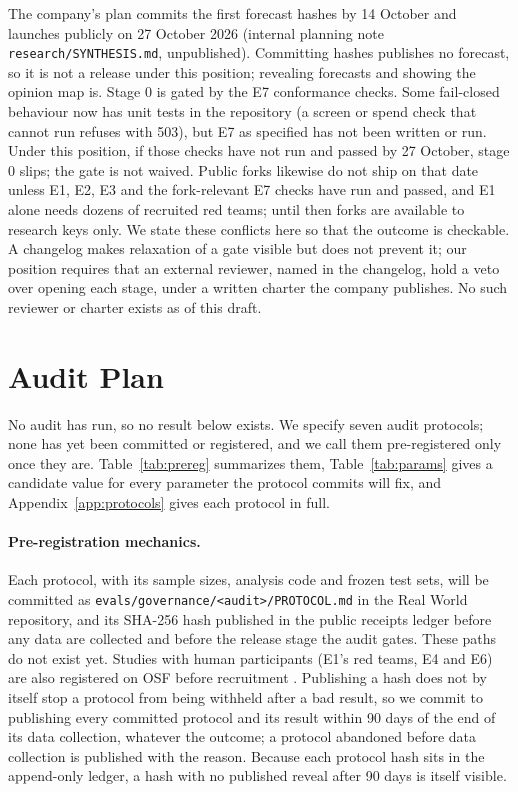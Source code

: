 \documentclass[11pt]{article}
\newcommand{\internal}[1]{internal planning note \nolinkurl{#1}, unpublished}
\begin{document}
The company's plan commits the first forecast hashes by 14 October and launches publicly on 27 October 2026 (\internal{research/SYNTHESIS.md}). Committing hashes publishes no forecast, so it is not a release under this position; revealing forecasts and showing the opinion map is. Stage 0 is gated by the E7 conformance checks. Some fail-closed behaviour now has unit tests in the repository (a screen or spend check that cannot run refuses with 503), but E7 as specified has not been written or run. Under this position, if those checks have not run and passed by 27 October, stage 0 slips; the gate is not waived. Public forks likewise do not ship on that date unless E1, E2, E3 and the fork-relevant E7 checks have run and passed, and E1 alone needs dozens of recruited red teams; until then forks are available to research keys only. We state these conflicts here so that the outcome is checkable. A changelog makes relaxation of a gate visible but does not prevent it; our position requires that an external reviewer, named in the changelog, hold a veto over opening each stage, under a written charter the company publishes. No such reviewer or charter exists as of this draft.

\section{Audit Plan}
\label{sec:protocols}

No audit has run, so no result below exists. We specify seven audit protocols; none has yet been committed or registered, and we call them pre-registered only once they are. Table~\ref{tab:prereg} summarizes them, Table~\ref{tab:params} gives a candidate value for every parameter the protocol commits will fix, and Appendix~\ref{app:protocols} gives each protocol in full.

\paragraph{Pre-registration mechanics.} Each protocol, with its sample sizes, analysis code and frozen test sets, will be committed as \nolinkurl{evals/governance/<audit>/PROTOCOL.md} in the Real World repository, and its SHA-256 hash published in the public receipts ledger before any data are collected and before the release stage the audit gates. These paths do not exist yet. Studies with human participants (E1's red teams, E4 and E6) are also registered on OSF before recruitment \citep{nosek2018preregistration}. Publishing a hash does not by itself stop a protocol from being withheld after a bad result, so we commit to publishing every committed protocol and its result within 90 days of the end of its data collection, whatever the outcome; a protocol abandoned before data collection is published with the reason. Because each protocol hash sits in the append-only ledger, a hash with no published reveal after 90 days is itself visible.
\end{document}
